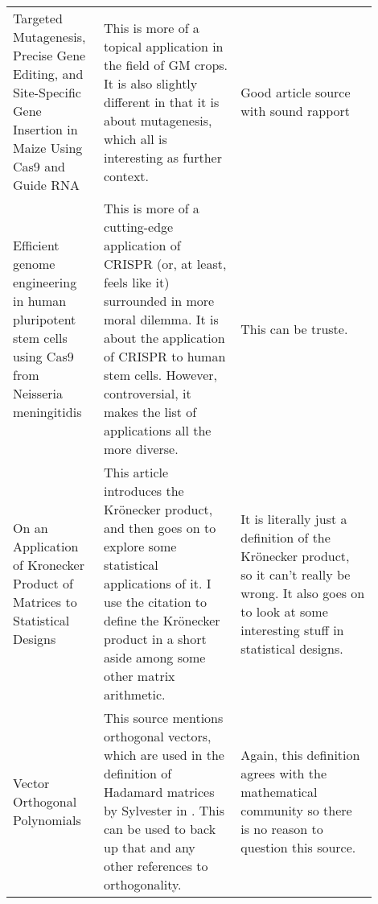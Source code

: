 \documentclass[a4paper,11pt]{article}
\begin{document}
\begin{center}
{\begin{longtable}{p{0.2\linewidth} p{0.35\linewidth} p{0.35\linewidth}}
    \\

    Targeted Mutagenesis, Precise Gene Editing, and Site-Specific Gene Insertion
    in Maize Using Cas9 and Guide RNA \cite{Maize2015Svitashev} &

    This is more of a topical application in the field of GM crops. It is also
    slightly different in that it is about mutagenesis, which all is interesting
    as further context. &

    Good article source with sound rapport

    \\

    Efficient genome engineering in human pluripotent stem cells using Cas9 from
    Neisseria meningitidis \cite{StemCells2013Hou} &

    This is more of a cutting-edge application of CRISPR (or, at least, feels
    like it) surrounded in more moral dilemma. It is about the application of
    CRISPR to human stem cells. However, controversial, it makes the list of
    applications all the more diverse. &

    This can be truste.

    \\

    On an Application of Kronecker Product of Matrices to Statistical Designs
    \cite{KroneckerProduct1955Vartak} &

    This article introduces the Kr\"onecker product, and then goes on to explore
    some statistical applications of it. I use the citation to define the
    Kr\"onecker product in a short aside among some other matrix arithmetic. &

    It is literally just a definition of the Kr\"onecker product, so it can't
    really be wrong. It also goes on to look at some interesting stuff in
    statistical designs.

    \\

    Vector Orthogonal Polynomials \cite{Orthogonal1981Burley} &

    This source mentions orthogonal vectors, which are used in the definition of
    Hadamard matrices by Sylvester in \cite{OrthogonalMatrix1867Sylvester}. This
    can be used to back up that and any other references to orthogonality. &

    Again, this definition agrees with the mathematical community so there is
    no reason to question this source.


\end{longtable}}
\end{center}
\end{document}
